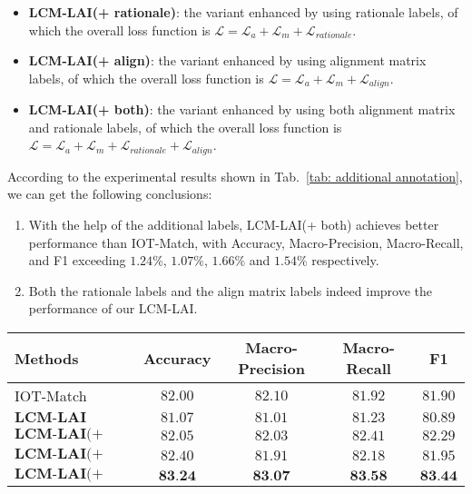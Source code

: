\begin{itemize}
\item \textbf{LCM-LAI(+ rationale)}: the variant enhanced by using rationale labels, of which the overall loss function is $\mathscr{L} = \mathscr{L}_{a} + \mathscr{L}_{m} + \mathscr{L}_{rationale}$.

\item \textbf{LCM-LAI(+ align)}: the variant enhanced by using alignment matrix labels, of which the overall loss function is  $\mathscr{L} = \mathscr{L}_{a} + \mathscr{L}_{m} + \mathscr{L}_{align}$.

\item \textbf{LCM-LAI(+ both)}: the variant enhanced by using both alignment matrix and rationale labels, of which the overall loss function is  $\mathscr{L} = \mathscr{L}_{a} + \mathscr{L}_{m} + \mathscr{L}_{rationale} + \mathscr{L}_{align}$.
\end{itemize}

According to the experimental results shown in Tab.~\ref{tab: additional annotation},
we can get the following conclusions:

\begin{enumerate}
    \item{
    With the help of the additional labels, LCM-LAI(+ both) achieves better performance than IOT-Match, with Accuracy, Macro-Precision, Macro-Recall, and F1 exceeding $1.24\%$, $1.07\%$, $1.66\%$ and $1.54\%$ respectively.
    }
    \item{
    Both the rationale labels and the align matrix labels indeed improve the performance of our LCM-LAI.
    }
\end{enumerate}


\begin{table*}[t]
\centering
\small
\caption{
The matching performance of LCM-LAI on the eCAIL dataset with additional annotations.
}\label{tab: additional annotation}
\begin{tabular}{lcccc}
\toprule
Methods   & Accuracy   & Macro-Precision   & Macro-Recall    & F1\\
 \midrule

IOT-Match          
                    & $ 82.00 $     & $ 82.10 $     & $ 81.92 $     & $ 81.90 $     \\

$\textbf{LCM-LAI}$    
                    & $ 81.07 $ & $ 81.01 $ 
                    & $ 81.23 $ & $ 80.89 $\\
 
$\textbf{LCM-LAI(+ rationale)}$    
                    & $ 82.05 $ & $ 82.03 $ 
                    & $ 82.41 $ & $ 82.29 $\\

$\textbf{LCM-LAI(+ align)}$    
                    & $ 82.40 $ & $ 81.91 $ 
                    & $ 82.18 $ & $ 81.95 $\\

$\textbf{LCM-LAI(+ both)}$    
                    & $ \textbf{83.24} $ & $ \textbf{83.07} $ 
                    & $ \textbf{83.58} $ & $ \textbf{83.44} $\\
\bottomrule
\end{tabular}%
\end{table*}

